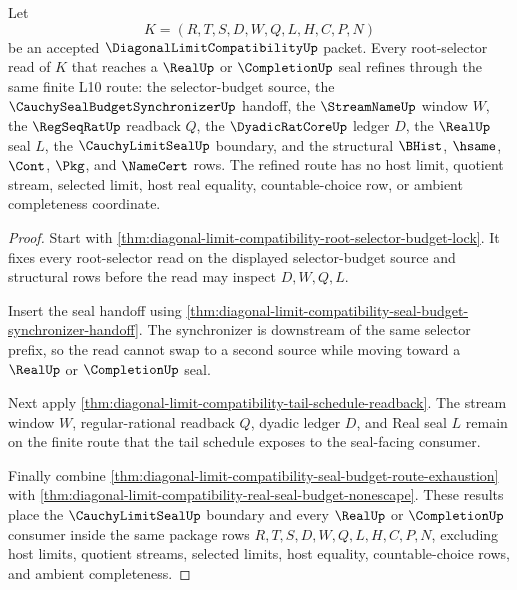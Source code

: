 \begin{theorem}
\label{thm:diagonal-limit-compatibility-root-selector-window-refinement}
Let
$$
K=(R,T,S,D,W,Q,L,H,C,P,N)
$$
be an accepted $\DiagonalLimitCompatibilityUp$ packet. Every root-selector read of $K$ that reaches a $\RealUp$ or $\CompletionUp$ seal refines through the same finite L10 route: the selector-budget source, the $\CauchySealBudgetSynchronizerUp$ handoff, the $\StreamNameUp$ window $W$, the $\RegSeqRatUp$ readback $Q$, the $\DyadicRatCoreUp$ ledger $D$, the $\RealUp$ seal $L$, the $\CauchyLimitSealUp$ boundary, and the structural $\BHist$, $\hsame$, $\Cont$, $\Pkg$, and $\NameCert$ rows. The refined route has no host limit, quotient stream, selected limit, host real equality, countable-choice row, or ambient completeness coordinate.
\end{theorem}
\begin{proof}
Start with \autoref{thm:diagonal-limit-compatibility-root-selector-budget-lock}. It fixes every root-selector read on the displayed selector-budget source and structural rows before the read may inspect $D,W,Q,L$.

Insert the seal handoff using \autoref{thm:diagonal-limit-compatibility-seal-budget-synchronizer-handoff}. The synchronizer is downstream of the same selector prefix, so the read cannot swap to a second source while moving toward a $\RealUp$ or $\CompletionUp$ seal.

Next apply \autoref{thm:diagonal-limit-compatibility-tail-schedule-readback}. The stream window $W$, regular-rational readback $Q$, dyadic ledger $D$, and Real seal $L$ remain on the finite route that the tail schedule exposes to the seal-facing consumer.

Finally combine \autoref{thm:diagonal-limit-compatibility-seal-budget-route-exhaustion} with \autoref{thm:diagonal-limit-compatibility-real-seal-budget-nonescape}. These results place the $\CauchyLimitSealUp$ boundary and every $\RealUp$ or $\CompletionUp$ consumer inside the same package rows $R,T,S,D,W,Q,L,H,C,P,N$, excluding host limits, quotient streams, selected limits, host equality, countable-choice rows, and ambient completeness.
\end{proof}

